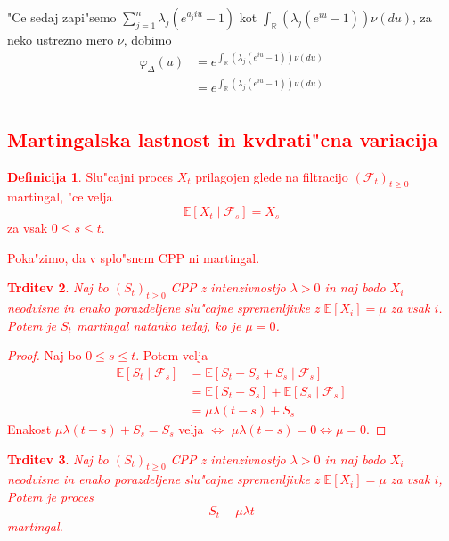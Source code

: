 \documentclass[12pt,a4paper]{amsart}
\theoremstyle{definition} %
\newtheorem{definicija}{Definicija}[section]
\theoremstyle{plain} %
\newtheorem{trditev}[definicija]{Trditev}
\newcommand{\R}{\mathbb{R}}
\newcommand{\E}{\mathbb{E}}
\newcommand{\F}{\mathcal{F}}
\newcommand{\1}{\mathds{1}}
\begin{document}
    \noindent
    "Ce sedaj zapi"semo $\sum_{j=1}^{n}\lambda_j\left(e^{a_j i u} - 1\right)$ kot 
    $\int_{\R}(\lambda_j\left(e^{i u}-1\right)) \nu(du)$, za neko ustrezno mero $\nu$, dobimo 
    \begin{align*}
        \varphi_{\Delta}(u)
            &= e^{\int_{\R}(\lambda_j\left(e^{i u}-1\right)) \nu(du)}\\
            &= e^{\int_{\R}(\lambda_j\left(e^{i u}-1\right)) \nu(du)}\\
    \end{align*}
\textcolor{red}{
    \subsection{Martingalska lastnost in kvdrati"cna variacija}
}
\textcolor{red}{  
        \begin{definicija}
            Slu"cajni proces $X_t$ prilagojen glede na filtracijo $(\F_t)_{t\geq0}$
            martingal, "ce velja 
            $$
                \E\left[X_t\mid\F_s\right] = X_s
            $$
            za vsak $0\leq s \leq t$.
            \label{def:martingal}
        \end{definicija}
}
\textcolor{red}{
        Poka"zimo, da v splo"snem CPP ni martingal.
}
\textcolor{red}{
        \begin{trditev}
            Naj bo $(S_t)_{t\geq0}$ CPP z intenzivnostjo $\lambda>0$ in naj bodo $X_i$ neodvisne
            in enako porazdeljene slu"cajne spremenljivke z $\E\left[X_i\right] = \mu$ za vsak $i$.
            Potem je $S_t$ martingal natanko tedaj, ko je $\mu = 0$.
            \label{trd:CPPnimartingal}
        \end{trditev}
}
\textcolor{red}{
        \begin{proof}
            Naj bo $0\leq s\leq t$. Potem velja
            \begin{align*}
                \E\left[S_t\mid\F_s\right] 
                        &= \E\left[S_t - S_s + S_s\mid \F_s\right] \\
                        &= \E\left[S_t - S_s\right] + \E\left[S_s\mid \F_s\right] \\
                        &= \mu\lambda(t-s) + S_s
            \end{align*}
           Enakost $\mu\lambda(t-s) + S_s = S_s$ velja $\iff$ $\mu\lambda(t-s) = 0 \iff \mu = 0$.
        \end{proof}
}
\textcolor{red}{
        \begin{trditev}
            Naj bo $(S_t)_{t\geq0}$ CPP z intenzivnostjo $\lambda > 0$ in naj bodo $X_i$ neodvisne
            in enako porazdeljene slu"cajne spremenljivke z $\E\left[X_i\right] = \mu$ za vsak $i$,
            Potem je proces 
            $$
                S_t - \mu\lambda t
            $$
            martingal.
            \label{trd:CPPpostanemartingal}
        \end{trditev}
}
\end{document}
